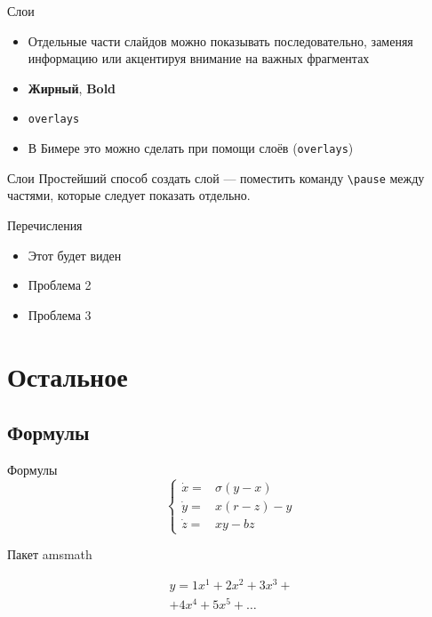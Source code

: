 \begin{frame}{Слои}
  \begin{itemize}
    \item<+-> Отдельные части слайдов можно показывать последовательно, заменяя информацию или акцентируя внимание на \alert<2>{важных фрагментах}
    \item<+-> \textbf{Жирный}, \textbf{Bold}
    \item<+-> \texttt{overlays}
    \item<+-> В Бимере это можно сделать при помощи слоёв (\texttt{overlays})
  \end{itemize}
\end{frame}

\begin{frame}{Слои}
  Простейший способ создать слой
  \pause
  --- поместить команду \texttt{\textbackslash pause} между частями,
  \pause
  которые следует показать отдельно.
\end{frame}

\begin{frame}{Перечисления}
  \begin{itemize}
    \item<1-> Этот будет виден
    \item<2> Проблема 2
    \item<3> Проблема 3
  \end{itemize}
\end{frame}


\section{Остальное}

\subsection{Формулы}

\begin{frame}{Формулы}
  \[
  \left\{
  \begin{array}{rl}
    \dot x = & \sigma (y-x)  \\
    \dot y = & x (r - z) - y \\
    \dot z = & xy - bz
  \end{array}
  \right.
  \]
\end{frame}

\begin{frame}{Пакет amsmath}
  \centering
  \begin{minipage}[t]{0.5\linewidth}
    \begin{multline*}
      y = 1 x^1 + 2 x^2 + 3 x^3 + \\ + 4 x^4 + 5 x^5 + \dots
    \end{multline*}
  \end{minipage}
\end{frame}


